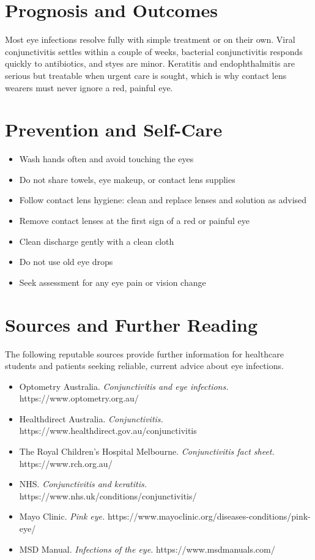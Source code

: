 \section*{Prognosis and Outcomes}
Most eye infections resolve fully with simple treatment or on their own. Viral conjunctivitis settles within a couple of weeks, bacterial conjunctivitis responds quickly to antibiotics, and styes are minor. Keratitis and endophthalmitis are serious but treatable when urgent care is sought, which is why contact lens wearers must never ignore a red, painful eye.

\section*{Prevention and Self-Care}
\begin{itemize}
    \item Wash hands often and avoid touching the eyes
    \item Do not share towels, eye makeup, or contact lens supplies
    \item Follow contact lens hygiene: clean and replace lenses and solution as advised
    \item Remove contact lenses at the first sign of a red or painful eye
    \item Clean discharge gently with a clean cloth
    \item Do not use old eye drops
    \item Seek assessment for any eye pain or vision change
\end{itemize}

\section*{Sources and Further Reading}
The following reputable sources provide further information for healthcare students and patients seeking reliable, current advice about eye infections.
\begin{itemize}
    \item Optometry Australia. \textit{Conjunctivitis and eye infections.} https://www.optometry.org.au/
    \item Healthdirect Australia. \textit{Conjunctivitis.} https://www.healthdirect.gov.au/conjunctivitis
    \item The Royal Children's Hospital Melbourne. \textit{Conjunctivitis fact sheet.} https://www.rch.org.au/
    \item NHS. \textit{Conjunctivitis and keratitis.} https://www.nhs.uk/conditions/conjunctivitis/
    \item Mayo Clinic. \textit{Pink eye.} https://www.mayoclinic.org/diseases-conditions/pink-eye/
    \item MSD Manual. \textit{Infections of the eye.} https://www.msdmanuals.com/
\end{itemize}
